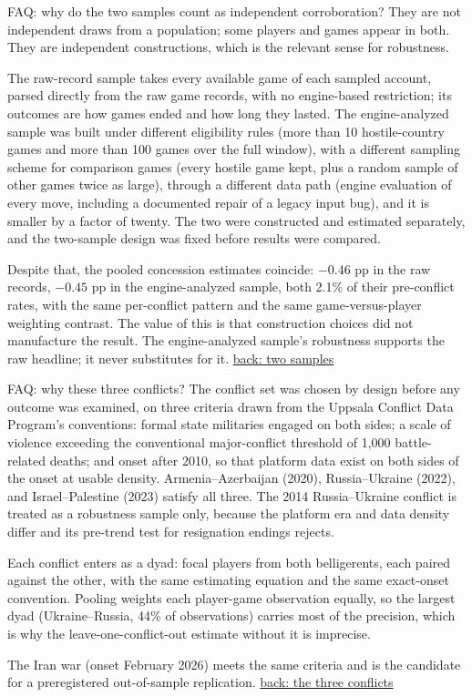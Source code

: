 \documentclass[aspectratio=169,11pt,t]{beamer}
\newcommand{\backto}[2]{\vfill\hfill\hyperlink{#1}{\textcolor{linkblue}{\scriptsize\textsf{back: #2}}}}
\begin{document}
\begin{frame}[label=faq-independent]{FAQ: why do the two samples count as independent corroboration?}
  \footnotesize
  They are not independent draws from a population; some players and games appear in both. They are independent constructions, which is the relevant sense for robustness.

  The raw-record sample takes every available game of each sampled account, parsed directly from the raw game records, with no engine-based restriction; its outcomes are how games ended and how long they lasted. The engine-analyzed sample was built under different eligibility rules (more than 10 hostile-country games and more than 100 games over the full window), with a different sampling scheme for comparison games (every hostile game kept, plus a random sample of other games twice as large), through a different data path (engine evaluation of every move, including a documented repair of a legacy input bug), and it is smaller by a factor of twenty. The two were constructed and estimated separately, and the two-sample design was fixed before results were compared.

  Despite that, the pooled concession estimates coincide: $-0.46$ pp in the raw records, $-0.45$ pp in the engine-analyzed sample, both 2.1\% of their pre-conflict rates, with the same per-conflict pattern and the same game-versus-player weighting contrast. The value of this is that construction choices did not manufacture the result. The engine-analyzed sample's robustness supports the raw headline; it never substitutes for it.
  \backto{samples}{two samples}
\end{frame}

\begin{frame}[label=faq-conflicts]{FAQ: why these three conflicts?}
  \footnotesize
  The conflict set was chosen by design before any outcome was examined, on three criteria drawn from the Uppsala Conflict Data Program's conventions: formal state militaries engaged on both sides; a scale of violence exceeding the conventional major-conflict threshold of 1,000 battle-related deaths; and onset after 2010, so that platform data exist on both sides of the onset at usable density. Armenia--Azerbaijan (2020), Russia--Ukraine (2022), and Israel--Palestine (2023) satisfy all three. The 2014 Russia--Ukraine conflict is treated as a robustness sample only, because the platform era and data density differ and its pre-trend test for resignation endings rejects.

  Each conflict enters as a dyad: focal players from both belligerents, each paired against the other, with the same estimating equation and the same exact-onset convention. Pooling weights each player-game observation equally, so the largest dyad (Ukraine--Russia, 44\% of observations) carries most of the precision, which is why the leave-one-conflict-out estimate without it is imprecise.

  The Iran war (onset February 2026) meets the same criteria and is the candidate for a preregistered out-of-sample replication.
  \backto{bk-table1-main}{the three conflicts}
\end{frame}
\end{document}
